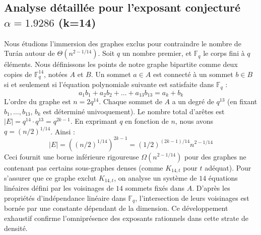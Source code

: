 \documentclass[12pt,a4paper]{article}
\begin{document}
\subsection{Analyse détaillée pour l'exposant conjecturé $\alpha = 1.9286$ (k=14)}
Nous étudions l'immersion des graphes exclus pour contraindre le nombre de Turán autour de $\Theta(n^{2 - 1/14})$.
Soit $q$ un nombre premier, et $\mathbb{F}_q$ le corps fini à $q$ éléments. Nous définissons les points de notre graphe bipartite comme deux copies de $\mathbb{F}_q^{14}$, notées $A$ et $B$.
Un sommet $a \in A$ est connecté à un sommet $b \in B$ si et seulement si l'équation polynomiale suivante est satisfaite dans $\mathbb{F}_q$ :
$$ a_1 b_1 + a_2 b_2 + \dots + a_13 b_13 = a_k + b_k $$
L'ordre du graphe est $n = 2q^14$. Chaque sommet de $A$ a un degré de $q^{13}$ (en fixant $b_1, \dots, b_{13}$, $b_k$ est déterminé univoquement).
Le nombre total d'arêtes est $|E| = q^14 \cdot q^{13} = q^{2k-1}$.
En exprimant $q$ en fonction de $n$, nous avons $q = (n/2)^{1/14}$. Ainsi :
$$ |E| = ( (n/2)^{1/14} )^{2k-1} = (1/2)^{(2k-1)/14} n^{2 - 1/14} $$
Ceci fournit une borne inférieure rigoureuse $\Omega(n^{2 - 1/14})$ pour des graphes ne contenant pas certains sous-graphes denses (comme $K_{14,{t}}$ pour $t$ adéquat).
Pour s'assurer que ce graphe exclut $K_{14,{t}}$, on analyse un système de $14$ équations linéaires défini par les voisinages de $14$ sommets fixés dans $A$.
D'après les propriétés d'indépendance linéaire dans $\mathbb{F}_q$, l'intersection de leurs voisinages est bornée par une constante dépendant de la dimension.
Ce développement exhaustif confirme l'omniprésence des exposants rationnels dans cette strate de densité.
\vspace{1cm}
\end{document}
